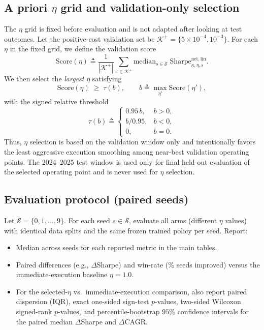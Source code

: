 \documentclass[10pt,twocolumn]{article}
\begin{document}
\subsection{A priori \texorpdfstring{$\eta$}{eta} grid and validation-only selection}
\label{sec:validation_selection}
The $\eta$ grid is fixed before evaluation and is not adapted after looking at test outcomes. Let the positive-cost validation set be $\mathcal{K}^{+}=\{5\times10^{-4},10^{-3}\}$. For each $\eta$ in the fixed grid, we define the validation score
\[
\mathrm{Score}(\eta)\triangleq \frac{1}{|\mathcal{K}^{+}|}\sum_{\kappa\in\mathcal{K}^{+}}\mathrm{median}_{s\in\mathcal{S}}\;\mathrm{Sharpe}^{\mathrm{net,lin}}_{\kappa,\eta,s}.
\]
We then select the \emph{largest} $\eta$ satisfying
\[
\mathrm{Score}(\eta)\;\ge\;\tau(b),\qquad
b\triangleq \max_{\eta'} \mathrm{Score}(\eta'),
\]
with the signed relative threshold
\[
\tau(b)\triangleq
\begin{cases}
0.95\,b, & b>0,\\
b/0.95, & b<0,\\
0, & b=0.
\end{cases}
\]
Thus, $\eta$ selection is based on the validation window only and intentionally favors the least aggressive execution smoothing among near-best validation operating points. The 2024--2025 test window is used only for final held-out evaluation of the selected operating point and is never used for $\eta$ selection.

\subsection{Evaluation protocol (paired seeds)}
Let $\mathcal{S}=\{0,1,\dots,9\}$. For each seed $s\in\mathcal{S}$, evaluate all arms (different $\eta$ values) with identical data splits and the same frozen trained policy per seed.
Report:
\begin{itemize}[leftmargin=*,itemsep=1pt]
\item Median across seeds for each reported metric in the main tables.
\item Paired differences (e.g., $\Delta$Sharpe) and win-rate (\% seeds improved) versus the immediate-execution baseline $\eta=1.0$.
\item For the selected-$\eta$ vs.\ immediate-execution comparison, also report paired dispersion (IQR), exact one-sided sign-test $p$-values, two-sided Wilcoxon signed-rank $p$-values, and percentile-bootstrap $95\%$ confidence intervals for the paired median $\Delta$Sharpe and $\Delta$CAGR.
\end{itemize}
\end{document}
